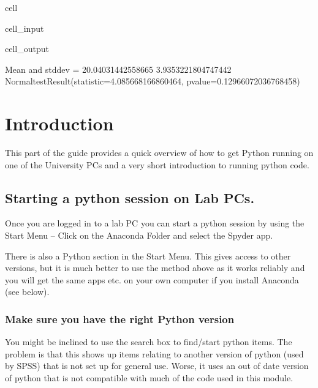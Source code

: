 \documentclass[letterpaper,10pt,english]{jupyterBook}
\begin{document}
\begin{sphinxuseclass}{cell}
\begin{sphinxVerbatimInput}
\begin{sphinxuseclass}{cell_input}
\end{sphinxuseclass}\end{sphinxVerbatimInput}
\begin{sphinxVerbatimOutput}

\begin{sphinxuseclass}{cell_output}
\begin{sphinxVerbatim}[commandchars=\\\{\}]
Mean and stddev =  20.04031442558665 3.9353221804747442
NormaltestResult(statistic=4.085668166860464, pvalue=0.12966072036768458)
\end{sphinxVerbatim}

\noindent{}

\end{sphinxuseclass}\end{sphinxVerbatimOutput}

\end{sphinxuseclass}
\sphinxstepscope


\chapter{Introduction}
\label{\detokenize{GettingStarted:introduction}}\label{\detokenize{GettingStarted::doc}}
\sphinxAtStartPar
This part of the guide provides a quick overview of how to get Python running on one of the University PCs and a very short introduction to running python code.


\section{Starting a python session on Lab PCs.}
\label{\detokenize{GettingStarted:starting-a-python-session-on-lab-pcs}}
\sphinxAtStartPar
Once you are logged in to a lab PC you can start a python session by using the Start Menu – Click on the Anaconda Folder and select the Spyder app.

\sphinxAtStartPar
There is also a Python section in the Start Menu. This gives access to other versions, but it is much better to use the method above as it works reliably and you will get the same apps etc. on your own computer if you install Anaconda (see below).


\subsection{Make sure you have the right Python version}
\label{\detokenize{GettingStarted:make-sure-you-have-the-right-python-version}}
\sphinxAtStartPar
You might be inclined to use the search box to find/start python items. The problem is that this shows up items relating to another version of python (used by SPSS) that is not set up for general use. Worse, it uses an out of date version of python that is not compatible with much of the code used in this module.
\end{document}
